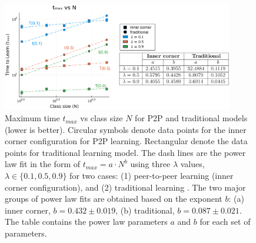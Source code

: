 \documentclass[10pt,a4paper,twoside]{article}
\begin{document}
\begin{figure}[h]
  \centering
  \includegraphics[width=0.9\textwidth]{figures/picture3}
  \caption{Maximum time $t_{max}$ vs class size $N$ for P2P and traditional models (lower is better). Circular symbols denote data points for the inner corner configuration for P2P learning. Rectangular denote the data points for traditional learning model. The dash lines are the power law fit in the form of $t_{max}=a \cdot N^b$ using three $\lambda$ values, $\lambda \in \lbrace 0.1, 0.5, 0.9 \rbrace$ for two cases: (1) peer-to-peer learning (inner corner configuration), and (2) traditional learning . The two major groups of power law fits are obtained based on the exponent $b$: (a) inner corner, $b = 0.432 \pm 0.019$, (b) traditional, $b=0.087\pm0.021$. The table contains the power law parameters $a$ and $b$ for each set of parameters.
  }
  \label{fig:tmax vs N}
\end{figure}

  
\end{document}
